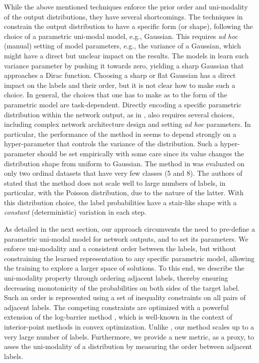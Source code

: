 \documentclass[8pt]{article}
\theoremstyle{definition}
\begin{document}
 While the above mentioned techniques enforce the prior order and uni-modality of the output distributions, they have several shortcomings. The techniques in \citep{gao2017deep,geng2016label,geng2013facial,huo2016deep} constrain the output distribution to have a specific form (or shape), following the choice of a parametric uni-modal model, e.g., Gaussian. This requires {\em ad hoc} (manual) setting of model parameters, e.g., the variance of a Gaussian, which might have a direct but unclear impact on the results. The models in \citep{beckham2016simple,pan2018mean} learn such variance parameter by pushing it towards zero, yielding a sharp Gaussian that approaches a Dirac function. Choosing a sharp or flat Gaussian has a direct impact on the labels and their order, but it is not clear how to make such a choice. In general, the choices that one has to make as to the form of the parametric model are task-dependent. Directly encoding a specific parametric distribution within the network output, as in \citep{beckham2017unimodal}, also requires several choices, including complex network architecture design and setting {\em ad hoc} parameters. In particular, the performance of the method in \citep{beckham2017unimodal} seems to depend strongly on a hyper-parameter that controls the variance of the distribution. Such a hyper-parameter should be set empirically with some care since its value changes the distribution shape from uniform to Gaussian.  The method in \citep{beckham2017unimodal} was evaluated on only two ordinal datasets that have very few classes (5 and 8). The authors of \citep{beckham2017unimodal} stated that the method does not scale well to large numbers of labels, in particular, with the Poisson distribution, due to the nature of the latter. With this distribution choice, the label probabilities have a stair-like shape with a \emph{constant} (deterministic) variation in each step.

 As detailed in the next section, our approach circumvents the need to pre-define a parametric uni-modal model for network outputs, and to set its parameters. We enforce uni-modality and a consistent order between the labels, but without constraining the learned representation to any specific parametric model, allowing the training to explore a larger space of solutions. To this end, we describe the uni-modality property through ordering adjacent labels, thereby ensuring decreasing monotonicity of the probabilities on both sides of the target label. Such an order is represented using a set of inequality constraints on all pairs of adjacent labels. The competing constraints are optimized with a powerful extension of the log-barrier method \citep{boyd2004convex,kervadec2019log}, which is well-known in the context of interior-point methods in convex optimization. Unlike \citep{beckham2017unimodal}, our method scales up to a very large number of labels. Furthermore, we provide a new metric, as a proxy, to asses the uni-modality of a distribution by measuring the order between adjacent labels.
\end{document}
